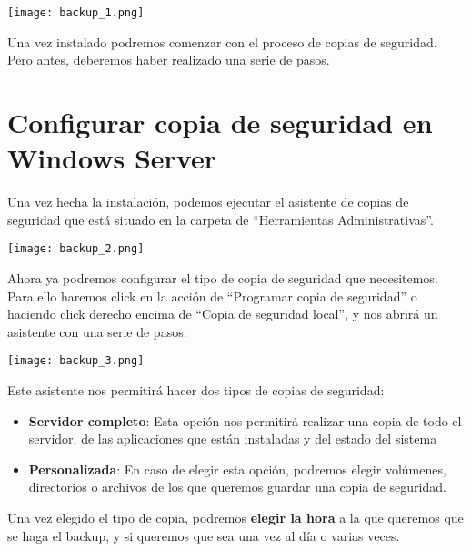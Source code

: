 \begin{center}
    \vspace{-20pt}
    \texttt{[image: backup\_1.png]}
    \vspace{-20pt}
\end{center}

Una vez instalado podremos comenzar con el proceso de copias de seguridad. Pero antes, deberemos haber realizado una serie de pasos.

\section{Configurar copia de seguridad en Windows Server}
Una vez hecha la instalación, podemos ejecutar el asistente de copias de seguridad que está situado en la carpeta de “Herramientas Administrativas”.

\begin{center}
    \vspace{-20pt}
    \texttt{[image: backup\_2.png]}
    \vspace{-20pt}
\end{center}

Ahora ya podremos configurar el tipo de copia de seguridad que necesitemos. Para ello haremos click en la acción de “Programar copia de seguridad” o haciendo click derecho encima de “Copia de seguridad local”, y nos abrirá un asistente con una serie de pasos:

\begin{center}
    \vspace{-20pt}
    \texttt{[image: backup\_3.png]}
    \vspace{-20pt}
\end{center}

Este asistente nos permitirá hacer dos tipos de copias de seguridad:

\begin{itemize}
    \item \textbf{Servidor completo}: Esta opción nos permitirá realizar una copia de todo el servidor, de las aplicaciones que están instaladas y del estado del sistema
    \item \textbf{Personalizada}: En caso de elegir esta opción, podremos elegir volúmenes, directorios o archivos de los que queremos guardar una copia de seguridad.
\end{itemize}

Una vez elegido el tipo de copia, podremos \textbf{elegir la hora} a la que queremos que se haga el backup, y si queremos que sea una vez al día o varias veces.

